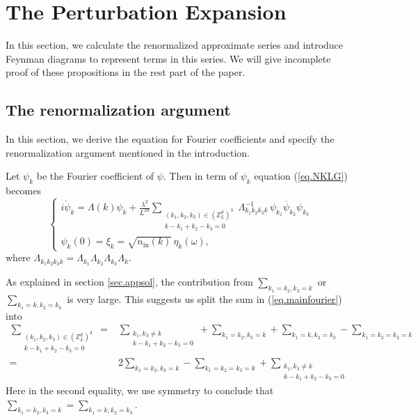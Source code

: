 \section{The Perturbation Expansion}
In this section, we calculate the renormalized approximate series and introduce Feynman diagrams to represent terms in this series. We will give incomplete proof of these propositions in the rest part of the paper.


\subsection{The renormalization argument} In this section, we derive the equation for Fourier coefficients and specify the renormalization argument mentioned in the introduction.

Let $\psi_k$ be the Fourier coefficient of $\psi$. Then in term of $\psi_k$ equation (\ref{eq.NKLG}) becomes
\begin{equation}\label{eq.mainfourier}
\begin{cases}
 i \dot{\psi}_{k} = \Lambda(k) \psi_k
 +\frac{\lambda^2}{L^{2d}} \sum\limits_{\substack{(k_1,k_2,k_{3}) \in (\mathbb{Z}^d_L)^3 \\ k - k_1 + k_2 -k_3 = 0}} \Lambda_{k_1k_2k_3k}^{-1}\,\psi_{k_1}\overline{\psi}_{k_2} \psi_{k_3} \\[2em]
\psi_k(0) = \xi_k = \sqrt{n_{\textrm{in}}(k)} \, \eta_{k}(\omega),
\end{cases}
\end{equation}
where $\Lambda_{k_1k_2k_3k}=\Lambda_{k_1}\Lambda_{k_2}\Lambda_{k_3}\Lambda_{k}$.

As explained in section \ref{sec.appsol}, the contribution from $\sum_{k_1=k_2,k_3=k}$ or $\sum_{k_1=k,k_2=k_3}$ is very large. This suggests us split the sum in (\ref{eq.mainfourier}) into
\begin{equation}
\begin{split}
\sum\limits_{\substack{(k_1,k_2,k_{3}) \in (\mathbb{Z}^d_L)^3 \\ k - k_1 + k_2 -k_3 = 0}}
=&\sum_{\substack{k_1, k_3\neq k\\ k - k_1 + k_2 -k_3 = 0}}+\sum_{k_1=k_2,k_3=k}+\sum_{k_1=k,k_2=k_3}-\sum_{k_1=k_2=k_3=k}
\\
=&2\sum_{k_1=k_2,k_3=k}-\sum_{k_1=k_2=k_3=k} +\sum_{\substack{k_1, k_3\neq k\\ k - k_1 + k_2 -k_3 = 0}} 
\end{split}
\end{equation}
Here in the second equality, we use symmetry to conclude that $\sum_{k_1=k_2,k_3=k}=\sum_{k_1=k,k_2=k_3}$.

